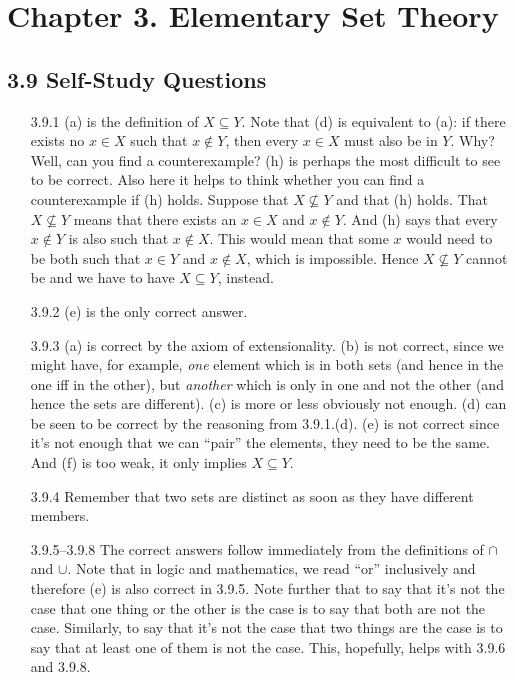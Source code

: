 \chapter{Chapter 3. Elementary Set Theory}

\section*{3.9 Self-Study Questions}

	\begin{enumerate}
	
		\item[3.9.1] (a) is the definition of $X\subseteq Y$. Note that (d) is equivalent to (a): if there exists no $x\in X$ such that $x\notin Y$, then every $x\in X$ must also be in $Y$. Why? Well, can you find a counterexample? (h) is perhaps the most difficult to see to be correct. Also here it helps to think whether you can find a counterexample if (h) holds. Suppose that $X\nsubseteq Y$ and that (h) holds. That $X\nsubseteq Y$ means that there exists an $x\in X$ and $x\notin Y$. And (h) says that every $x\notin Y$ is also such that $x\notin X$. This would mean that some $x$ would need to be both such that $x\in Y$ and $x\notin X$, which is impossible. Hence $X\nsubseteq Y$ cannot be and we have to have $X\subseteq Y$, instead.
		
		\item[3.9.2] (e) is the only correct answer.
		
		\item[3.9.3] (a) is correct by the axiom of extensionality. (b) is not correct, since we might have, for example, \emph{one} element which is in both sets (and hence in the one iff in the other), but \emph{another} which is only in one and not the other (and hence the sets are different). (c) is more or less obviously not enough. (d) can be seen to be correct by the reasoning from 3.9.1.(d). (e) is not correct since it's not enough that we can ``pair'' the elements, they need to be the same. And (f) is too weak, it only implies $X\subseteq Y$.
		
		\item[3.9.4] Remember that two sets are distinct as soon as they have different members.
	
		\item[3.9.5--3.9.8] The correct answers follow immediately from the definitions of $\cap$ and $\cup$. Note that in logic and mathematics, we read ``or'' inclusively and therefore (e) is also correct in 3.9.5. Note further that to say that it's not the case that one thing or the other is the case is to say that both are not the case. Similarly, to say that it's not the case that two things are the case is to say that at least one of them is not the case. This, hopefully, helps with 3.9.6 and 3.9.8. 
		

\end{enumerate}
